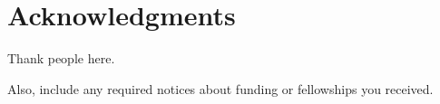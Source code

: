 \chapter{Acknowledgments}

Thank people here.

Also, include any required notices about funding or fellowships you received.
